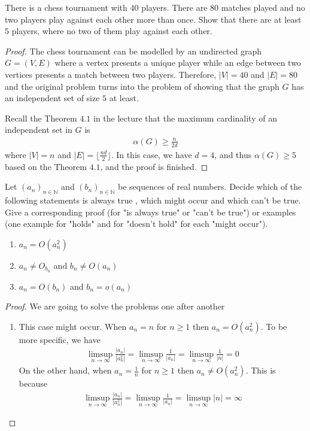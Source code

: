 \begin{problem}
  There is a chess tournament with $40$ players. There are $80$ matches played and no two players play against each other more than once. Show that there are at least $5$ players, where no two of them play against each other.
\end{problem}
\begin{proof}
  The chess tournament can be modelled by an undirected graph $G=(V,E)$ where a vertex presents a unique player while an edge between two vertices presents a match between two players. Therefore, $|V|=40$ and $|E|=80$ and the original problem turns into the problem of showing that the graph $G$ has an independent set of size $5$ at least.

  Recall the Theorem $4.1$ in the lecture that the maximum cardinality of an independent set in $G$ is 
  \begin{align*}
    \alpha(G) \geq \frac{n}{2d} 
  \end{align*}
  where $|V|=n$ and $|E| = \lfloor \frac{nd}{2} \rfloor$. In this case, we have $d=4$, and thus $\alpha(G) \geq 5$ based on the Theorem $4.1$, and the proof is finished.
\end{proof}

\begin{problem}
  Let $(a_{n})_{n \in \mathbb{N}}$ and $(b_{n})_{n \in \mathbb{N}}$ be sequences of real numbers. Decide which of the following statements is always true , which might occur and which can't be true. Give a corresponding proof (for "is always true" or "can't be true") or examples (one example for "holds" and for "doesn't hold" for each "might occur").
  \begin{enumerate}[label=(\roman*)]
    \item $a_{n} = O(a_{n}^{2})$
    \item $a_{n} \neq O_{b_{n}}$ and $b_{n} \neq O(a_{n})$
    \item $a_{n} = O(b_{n})$ and $b_{n} = o(a_{n})$
  \end{enumerate}
\end{problem}
\begin{proof}
  We are going to solve the problems one after another
  \begin{enumerate}[label=(\roman*)]
    \item This case might occur. When $a_{n}=n$ for $n \geq 1$ then $a_{n}=O(a_{n}^{2})$. To be more specific, we have
    \begin{align*}
      \limsup_{n \to \infty} \frac{|a_{n}|}{|a_{n}^{2}|} = \limsup_{n \to \infty} \frac{1}{|a_{n}|} = \limsup_{n \to \infty} \frac{1}{|n|} = 0
    \end{align*}
    On the other hand, when $a_{n}=\frac{1}{n}$ for $n \geq 1$ then $a_{n} \neq O(a_{n}^{2})$. This is because
    \begin{align*}
      \limsup_{n \to \infty} \frac{|a_{n}|}{|a_{n}^{2}|} = \limsup_{n \to \infty} \frac{1}{|a_{n}|} = \limsup_{n \to \infty} |n| = \infty
    \end{align*}
  \end{enumerate}
\end{proof}
